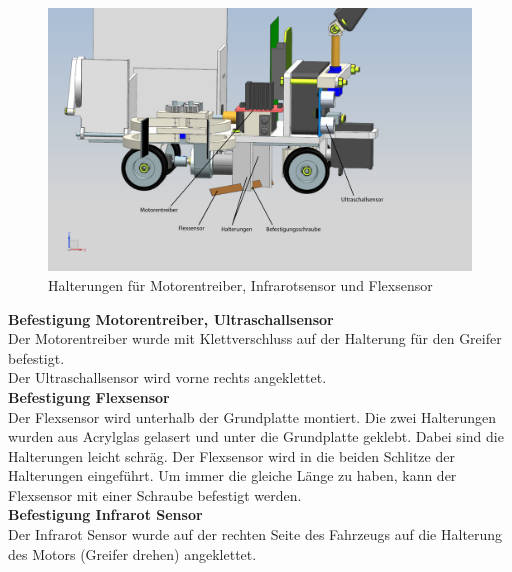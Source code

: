 \begin{figure}[H]
\centering
\includegraphics[width=1\textwidth]{03_Loesungskonzept/pictures/halterungen1.png}
\caption{Halterungen für Motorentreiber, Infrarotsensor und Flexsensor}
\end{figure}
\textbf{Befestigung Motorentreiber, Ultraschallsensor}\\[0.2cm]
Der Motorentreiber wurde mit Klettverschluss auf der Halterung für den Greifer befestigt.\\[0.2cm]
Der Ultraschallsensor wird vorne rechts angeklettet.\\[0.2cm]
\textbf{Befestigung Flexsensor}\\[0.2cm]
Der Flexsensor wird unterhalb der Grundplatte montiert. Die zwei Halterungen wurden aus Acrylglas gelasert und unter die Grundplatte geklebt. Dabei sind die Halterungen leicht schräg. Der Flexsensor wird in die beiden Schlitze der Halterungen eingeführt. Um immer die gleiche Länge zu haben, kann der Flexsensor mit einer Schraube befestigt werden.\\[0.2cm]
\textbf{Befestigung Infrarot Sensor}\\[0.2cm]
Der Infrarot Sensor wurde auf der rechten Seite des Fahrzeugs auf die Halterung des Motors (Greifer drehen) angeklettet.